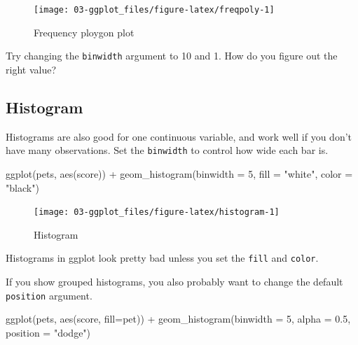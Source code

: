 \documentclass[
  oneside]{book}
\newenvironment{Shaded}{\begin{snugshade}}{\end{snugshade}}
\newcommand{\AttributeTok}[1]{\textcolor[rgb]{0.77,0.63,0.00}{#1}}
\newcommand{\DecValTok}[1]{\textcolor[rgb]{0.00,0.00,0.81}{#1}}
\newcommand{\FloatTok}[1]{\textcolor[rgb]{0.00,0.00,0.81}{#1}}
\newcommand{\FunctionTok}[1]{\textcolor[rgb]{0.00,0.00,0.00}{#1}}
\newcommand{\NormalTok}[1]{#1}
\newcommand{\SpecialCharTok}[1]{\textcolor[rgb]{0.00,0.00,0.00}{#1}}
\newcommand{\StringTok}[1]{\textcolor[rgb]{0.31,0.60,0.02}{#1}}
\begin{document}
\begin{figure}

{\centering \texttt{[image: 03-ggplot\_files/figure-latex/freqpoly-1]} 

}

\caption{Frequency ploygon plot}\label{fig:freqpoly}
\end{figure}

\begin{try}
Try changing the \texttt{binwidth} argument to 10 and 1. How do you figure out the right value?

\end{try}

\hypertarget{geom_histogram}{%
\subsection{Histogram}\label{geom_histogram}}

Histograms are also good for one continuous variable, and work well if you don't have many observations. Set the \texttt{binwidth} to control how wide each bar is.

\begin{Shaded}
\begin{Highlighting}[]
\FunctionTok{ggplot}\NormalTok{(pets, }\FunctionTok{aes}\NormalTok{(score)) }\SpecialCharTok{+}
  \FunctionTok{geom\_histogram}\NormalTok{(}\AttributeTok{binwidth =} \DecValTok{5}\NormalTok{, }\AttributeTok{fill =} \StringTok{"white"}\NormalTok{, }\AttributeTok{color =} \StringTok{"black"}\NormalTok{)}
\end{Highlighting}
\end{Shaded}

\begin{figure}

{\centering \texttt{[image: 03-ggplot\_files/figure-latex/histogram-1]} 

}

\caption{Histogram}\label{fig:histogram}
\end{figure}

\begin{info}
Histograms in ggplot look pretty bad unless you set the \texttt{fill} and \texttt{color}.

\end{info}

If you show grouped histograms, you also probably want to change the default \texttt{position} argument.

\begin{Shaded}
\begin{Highlighting}[]
\FunctionTok{ggplot}\NormalTok{(pets, }\FunctionTok{aes}\NormalTok{(score, }\AttributeTok{fill=}\NormalTok{pet)) }\SpecialCharTok{+}
  \FunctionTok{geom\_histogram}\NormalTok{(}\AttributeTok{binwidth =} \DecValTok{5}\NormalTok{, }\AttributeTok{alpha =} \FloatTok{0.5}\NormalTok{, }
                 \AttributeTok{position =} \StringTok{"dodge"}\NormalTok{)}
\end{Highlighting}
\end{Shaded}
\end{document}
